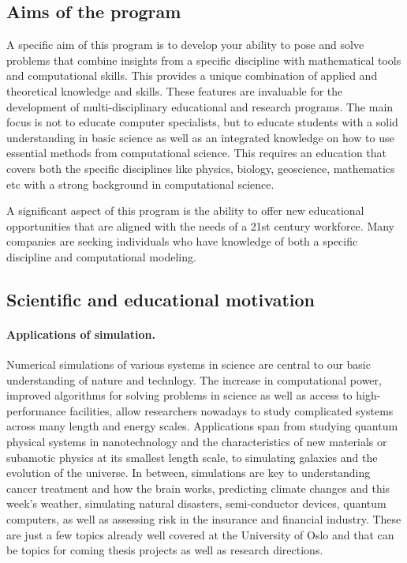\documentclass[%
oneside,                 %
final,                   %
10pt]{article}
\begin{document}
\subsection{Aims of the program}


A specific aim of this program is to develop your ability to pose and
solve problems that combine  insights from a specific discipline with mathematical tools
and computational skills. This provides a unique combination
of applied and theoretical knowledge and skills. These features are invaluable
for the development of multi-disciplinary educational and research programs.
The main focus is not to educate computer
specialists, but to educate students with a solid understanding in basic science
as well as an integrated knowledge on how  to use
essential methods from computational science. This requires an
education that covers both the specific disciplines like physics, biology,
geoscience, mathematics etc with a strong background in computational science.


A significant aspect of this program is the ability to offer new educational
opportunities that are aligned with the needs of a 21st century
workforce. Many companies are seeking
individuals who have knowledge of both a specific discipline and
computational modeling.


\subsection{Scientific and educational motivation}


\paragraph{Applications of simulation.}
Numerical simulations of various systems in science are central to our
basic understanding of nature and technlogy.
The increase in computational power,
improved algorithms for solving problems in science as well as access
to high-performance facilities, allow researchers nowadays to study
complicated systems across many length and energy scales. Applications
span from studying quantum physical systems in nanotechnology and the
characteristics of new materials or subamotic physics at its smallest
length scale, to simulating galaxies and the evolution of the universe.
In between, simulations are key to understanding
cancer treatment and how the brain works,
predicting climate changes and this week's weather,
simulating natural disasters, semi-conductor devices,
quantum computers, as well as assessing risk in the insurance and
financial industry. These are just a few topics
already well covered at the University of Oslo and that can be
topics for coming thesis projects as well as research directions.
\end{document}
